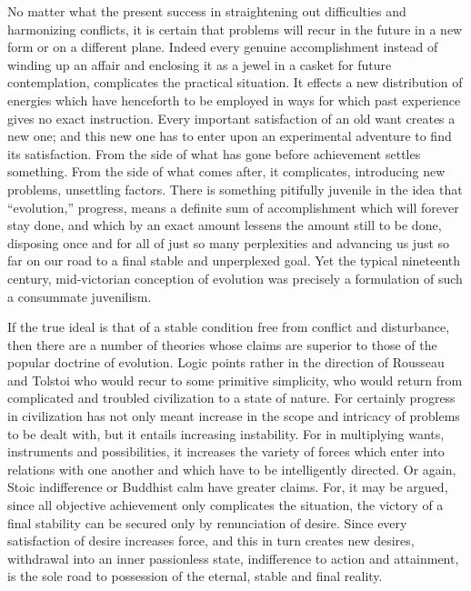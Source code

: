 \documentclass[12pt]{article}
\begin{document}
No matter what the present success in straightening
out difficulties and harmonizing conflicts, it is certain
that problems will recur in the future in a new form
or on a different plane. Indeed every genuine accomplishment
instead of winding up an affair and enclosing
it as a jewel in a casket for future contemplation,
complicates the practical situation. It effects a new
distribution of energies which have henceforth to be
employed in ways for which past experience gives no
exact instruction. Every important satisfaction of an
old want creates a new one; and this new one has to
enter upon an experimental adventure to find its satisfaction.
From the side of what has gone before
achievement settles something. From the side of what
comes after, it complicates, introducing new problems,
unsettling factors. There is something pitifully juvenile
in the idea that ``evolution,'' progress, means a
definite sum of accomplishment which will forever stay
done, and which by an exact amount lessens the amount
still to be done, disposing once and for all of just so
many perplexities and advancing us just so far on our
road to a final stable and unperplexed goal. Yet the
typical nineteenth century, mid-victorian conception of
evolution was precisely a formulation of such a consummate
juvenilism.

If the true ideal is that of a stable condition free
from conflict and disturbance, then there are a number
of theories whose claims are superior to those of the
popular doctrine of evolution. Logic points rather in
the direction of Rousseau and Tolstoi who would recur
to some primitive simplicity, who would return from
complicated and troubled civilization to a state of nature.
For certainly progress in civilization has not only
meant increase in the scope and intricacy of problems
to be dealt with, but it entails increasing instability.
For in multiplying wants, instruments and possibilities,
it increases the variety of forces which enter into relations
with one another and which have to be intelligently
directed. Or again, Stoic indifference or Buddhist
calm have greater claims. For, it may be argued,
since all objective achievement only complicates the situation,
the victory of a final stability can be secured
only by renunciation of desire. Since every satisfaction
of desire increases force, and this in turn creates
new desires, withdrawal into an inner passionless state,
indifference to action and attainment, is the sole road
to possession of the eternal, stable and final reality.
\end{document}
